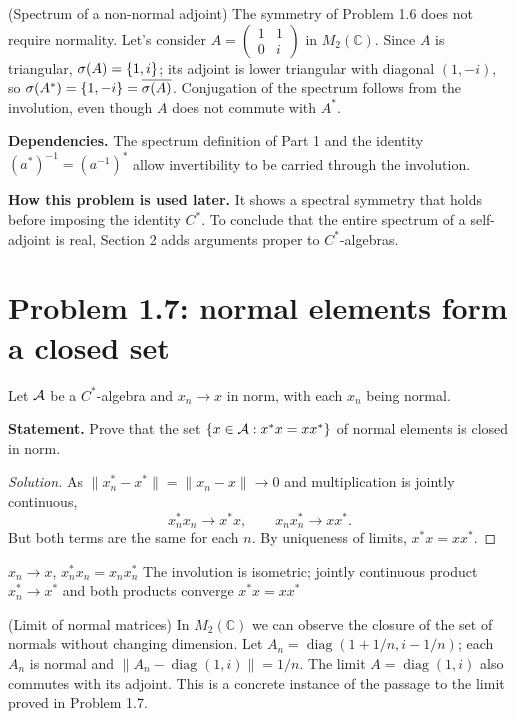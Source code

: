 \begin{cthejemplo}{(Spectrum of a non-normal adjoint)}
The symmetry of Problem 1.6 does not require normality. Let's consider
$A=\begin{pmatrix}1&1\\0&i\end{pmatrix}$ in $M_2(\mathbb C)$.
Since $A$ is triangular, $\sigma(A)=\{1,i\}$; its adjoint is lower triangular with diagonal
$(1,-i)$, so $\sigma(A^*)=\{1,-i\}=\overline{\sigma(A)}$.
Conjugation of the spectrum follows from the involution, even though $A$ does not commute with $A^*$.
\end{cthejemplo}

\noindent\textbf{Dependencies.} The spectrum definition of Part 1 and the identity $(a^*)^{-1}=(a^{-1})^*$ allow invertibility to be carried through the involution.

\noindent\textbf{How this problem is used later.} It shows a spectral symmetry that holds before imposing the identity $C^*$. To conclude that the entire spectrum of a self-adjoint is real, Section 2 adds arguments proper to $C^*$-algebras.

\section{Problem 1.7: normal elements form a closed set}

Let $\mathcal A$ be a $C^*$-algebra and $x_n\to x$ in norm, with each $x_n$ being normal.

\noindent\textbf{Statement.} Prove that the set $\{x\in\mathcal A:x^*x=xx^*\}$ of normal elements is closed in norm.

\begin{proof}[Solution]
As $\|x_n^*-x^*\|=\|x_n-x\|\to0$ and multiplication is jointly continuous,
\[
 x_n^*x_n\to x^*x,
 \qquad
 x_nx_n^*\to xx^*.
\]
But both terms are the same for each $n$. By uniqueness of limits, $x^*x=xx^*$.
\end{proof}

\proofdiagram
{$x_n\to x$, $x_n^*x_n=x_nx_n^*$}
{The involution is isometric; jointly continuous product}
{$x_n^*\to x^*$ and both products converge}
{$x^*x=xx^*$}

\begin{cthejemplo}{(Limit of normal matrices)}
In $M_2(\mathbb C)$ we can observe the closure of the set of normals without changing dimension.
Let $A_n=\operatorname{diag}(1+1/n,i-1/n)$; each $A_n$ is normal and
$\|A_n-\operatorname{diag}(1,i)\|=1/n$.
The limit $A=\operatorname{diag}(1,i)$ also commutes with its adjoint.
This is a concrete instance of the passage to the limit proved in Problem 1.7.
\end{cthejemplo}

